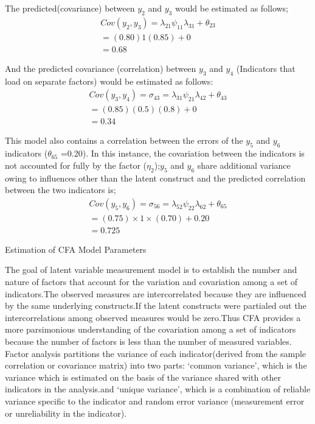 \documentclass{beamer}
\begin{document}
\begin{frame}
The predicted(covariance) between $y_2$ and $y_3$ would be estimated as follows;
\begin{align*}
	Cov(y_2, y_3)=\lambda_{21} \psi_{11}\lambda_{31} +\theta_{23}\\
	=(0.80)1(0.85) +0\\
	=0.68
\end{align*}
\end{frame}
\begin{frame}
	And the predicted covariance (correlation) between $y_3$ and $y_4$ (Indicators that load on separate factors) would be estimated as follows:
	\begin{align*}
		Cov(y_3,y_4)=\sigma_{43}= \lambda_{31}\psi_{21}\lambda_{42}+\theta_{43}\\
		=(0.85)(0.5)(0.8)+0\\
		=0.34
	\end{align*}
\end{frame}
\begin{frame}
	This model also contains a correlation between the errors of the $y_5$ and $y_6$ indicators ($\theta_{65}$ =0.20). In this instance, the covariation between the indicators is not accounted for fully by the factor ($\eta_2$);$y_5$ and $y_6$ share additional variance owing to influences other than the latent construct and the predicted correlation between the two indicators is;
	\begin{align*}
		Cov(y_5,y_6)=\sigma_{56}=\lambda_{52}\psi_{22}\lambda_{62}+\theta_{65}\\
		=(0.75)\times1\times(0.70)+0.20\\
		=0.725
	\end{align*}
\end{frame}
\begin{frame}{Estimation of CFA Model Parameters}

The goal of latent variable measurement model is to establish the number and nature of factors that account for the variation and covariation among a set of indicators.The observed measures are intercorrelated because they are influenced by the same underlying constructs.If the latent constructs were partialed out the intercorrelations among observed measures would be zero.Thus CFA provides a more parsimonious understanding of the covariation among a set of indicators because the number of factors is less than the number of measured variables.\\

\noindent Factor analysis partitions the variance of each indicator(derived from the sample correlation or covariance matrix) into two parts: ‘common variance’, which is the variance which is estimated on the basis of the variance shared with other indicators in the analysis.and ‘unique variance’, which is a combination of reliable variance specific to the indicator and random error variance (measurement error or unreliability in the indicator).
\end{frame}
\end{document}
